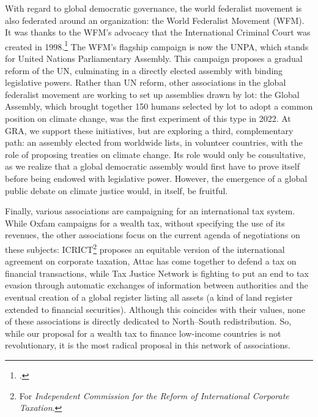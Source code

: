 \documentclass[a5paper,english,openany]{memoir}
\begin{document}
With regard to global democratic governance, the world federalist movement is also federated around an organization: %
the World Federalist Movement (WFM). It was thanks to the WFM's advocacy that the International Criminal Court was created in 1998.\footnote{\citet{schiff_building_2008}.} 
The WFM's flagship campaign is now the UNPA, which stands for United Nations Parliamentary Assembly. This campaign proposes a gradual reform of the UN, culminating in a directly elected assembly with binding legislative powers. Rather than UN reform, other associations in the global federalist movement are working to set up assemblies drawn by lot: the Global Assembly, which brought together 150 humans selected %
by lot to adopt a common position on climate change, was the first experiment of this type in 2022. 
At GRA, we support these initiatives, but are exploring a third, complementary path: 
an assembly elected from worldwide lists, in volunteer countries, with the role of proposing treaties on climate change. 
Its role would only be consultative, as we realize %
that a global democratic assembly would first have to prove itself before being endowed with legislative power. However, the emergence of a global public debate on climate justice would, in itself, be fruitful. %

Finally, various associations are campaigning for an international tax system. While Oxfam campaigns for a wealth tax, without specifying the use of its revenues, %
the other associations focus on the current agenda of negotiations on these subjects: ICRICT\footnote{For \textit{Independent Commission for the Reform of International Corporate Taxation}.} 
proposes an equitable version of the international agreement on corporate taxation, Attac has come together to defend a tax on financial transactions, while Tax Justice Network is fighting to put an end to tax evasion through automatic exchanges of information between authorities and the eventual creation of a global register listing all assets (a kind of land register extended to financial securities). Although this coincides with their values, none of these associations is directly dedicated to North--South redistribution. So, while our proposal for a wealth tax to finance low-income countries is not revolutionary, it is the most radical proposal in this network of associations. 
\end{document}
